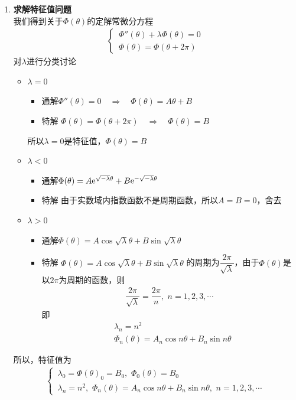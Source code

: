 \begin{enumerate}[\textbf{步骤}1 ]
	\item \textbf{求解特征值问题}\\
	我们得到关于$\Phi(\theta)$的定解常微分方程
	\begin{align}
		\begin{cases}
			\, \Phi''(\theta) + \lambda \Phi(\theta) = 0\\
			\, \Phi(\theta) = \Phi(\theta + 2\pi)
		\end{cases}
	\end{align}
	对$\lambda$进行分类讨论
	\begin{itemize}
		\item $\lambda = 0$
		\begin{itemize}
			\item 通解\quad $\Phi''(\theta) =0 \quad \Rightarrow \quad \Phi(\theta) = A \theta + B$
			\item 特解 \quad $\Phi(\theta) = \Phi(\theta + 2\pi) \quad \Rightarrow \quad \Phi(\theta) = B$
		\end{itemize}
		所以$\lambda = 0$是特征值，$\Phi(\theta) = B$
		
		\item $\lambda < 0$
		\begin{itemize}
			\item 通解\quad $\Phi(\theta) = A{\rm{e}}^{\sqrt{-\lambda}\theta} + B {\rm{e}}^{-\sqrt{-\lambda}\theta}$
			\item 特解 \quad 由于实数域内指数函数不是周期函数，所以$A = B = 0$，舍去
		\end{itemize}
		
		\item $\lambda > 0$
		\begin{itemize}
			\item 通解\quad $\Phi(\theta) = A \cos \sqrt{\lambda}\theta  + B\sin \sqrt{\lambda}\theta $
			\item 特解 \quad $\Phi(\theta) = A \cos \sqrt{\lambda}\theta  + B\sin  \sqrt{\lambda}\theta $ 的周期为$\dfrac{2 \pi}{\sqrt{\lambda}}$，由于$\Phi(\theta)$是以$2 \pi $为周期的函数，则
			\begin{align*}
				\dfrac{2 \pi}{\sqrt{\lambda}} = \dfrac{2\pi}{n}, \,\, n = 1,2,3,\cdots
			\end{align*}
			即
			\begin{align}
				&\lambda_n = n^2\\
				&\Phi_n(\theta) = A_n \cos n\theta  + B_n \sin n\theta 
			\end{align}
		\end{itemize}
	\end{itemize}
	所以，特征值为
	\begin{align*}
		\begin{cases}
			\, \lambda_0 = \Phi(\theta)_0 = B_0,\,\, \Phi_0(\theta) = B_0\\
			\, \lambda_n = n^2,\, \, \Phi_n(\theta) = A_n \cos n\theta  + B_n \sin n \theta ,\,\, n = 1,2,3,\cdots
		\end{cases}
	\end{align*}
	

\end{enumerate}
